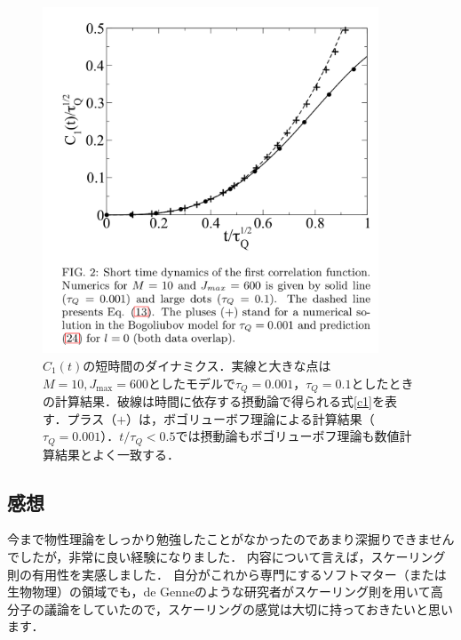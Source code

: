 \documentclass[a4paper,11pt]{jsarticle}
\begin{document}
\begin{figure}[htbp]
  \centering
  \includegraphics[width=10cm]{SSP3_2.png}
  \caption{$C_1(t)$の短時間のダイナミクス．実線と大きな点は$M=10, J_{\mathrm{max}}=600$としたモデルで$\tau_Q=0.001$，$\tau_Q=0.1$としたときの計算結果．破線は時間に依存する摂動論で得られる式\eqref{c1}を表す．プラス（$+$）は，ボゴリューボフ理論による計算結果（$\tau_Q=0.001$）．$t/\tau_Q < 0.5$では摂動論もボゴリューボフ理論も数値計算結果とよく一致する．}
  \label{fig:paper_2}
\end{figure}

\subsection*{感想}
今まで物性理論をしっかり勉強したことがなかったのであまり深掘りできませんでしたが，非常に良い経験になりました．
内容について言えば，スケーリング則の有用性を実感しました．
自分がこれから専門にするソフトマター（または生物物理）の領域でも，de Genneのような研究者がスケーリング則を用いて高分子の議論をしていたので，スケーリングの感覚は大切に持っておきたいと思います．
\end{document}

